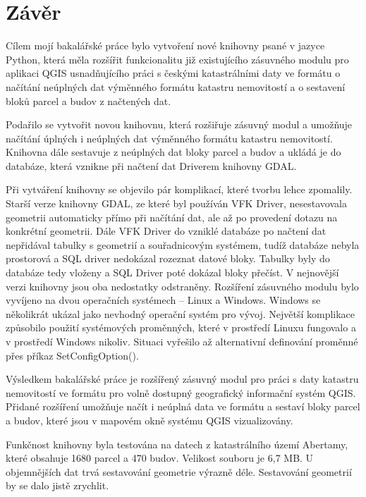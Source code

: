 \chapter{Závěr}
\label{5-zaver}
Cílem mojí bakalářské práce bylo vytvoření nové knihovny psané v jazyce Python, která měla rozšířit funkcionalitu již existujícího zásuvného modulu pro aplikaci QGIS usnadňujícího práci s českými katastrálními daty ve formátu  o načítání neúplných dat výměnného formátu katastru nemovitostí a o sestavení bloků parcel a budov z načtených dat.

Podařilo se vytvořit novou knihovnu, která rozšiřuje zásuvný modul a umožňuje načítání úplných i neúplných dat výměnného formátu katastru nemovitostí. Knihovna dále sestavuje z neúplných dat bloky parcel a budov a ukládá je do databáze, která vznikne při načtení dat  Driverem knihovny GDAL.

Při vytváření knihovny se objevilo pár komplikací, které tvorbu lehce zpomalily. Starší verze knihovny GDAL, ze které byl používán VFK Driver, nesestavovala geometrii automaticky přímo při načítání dat, ale až po provedení dotazu na konkrétní geometrii. Dále VFK Driver do vzniklé databáze po načtení dat nepřidával tabulky s geometrií a souřadnicovým systémem, tudíž databáze nebyla prostorová a SQL driver nedokázal rozeznat datové bloky. Tabulky byly do databáze tedy vloženy a SQL Driver poté dokázal bloky přečíst. V nejnovější verzi knihovny jsou oba nedostatky odstraněny. Rozšíření zásuvného modulu bylo vyvíjeno na dvou operačních systémech -- Linux a Windows. Windows se několikrát ukázal jako nevhodný operační systém pro vývoj. Největší komplikace způsobilo použití systémových proměnných, které v prostředí Linuxu fungovalo a v prostředí Windows nikoliv. Situaci vyřešilo až alternativní definování proměnné přes příkaz SetConfigOption().

Výsledkem bakalářské práce je rozšířený zásuvný modul pro práci s daty katastru nemovitostí ve formátu  pro volně dostupný geografický informační systém QGIS. Přidané rozšíření umožňuje načít i neúplná data ve formátu  a sestaví bloky parcel a budov, které jsou v mapovém okně systému QGIS vizualizovány.

Funkčnost knihovny byla testována na datech z katastrálního území Abertamy, které obsahuje 1680 parcel a 470 budov. Velikost  souboru je 6,7 MB. U objemnějších dat trvá sestavování geometrie výrazně déle. Sestavování geometrií by se dalo jistě zrychlit.

